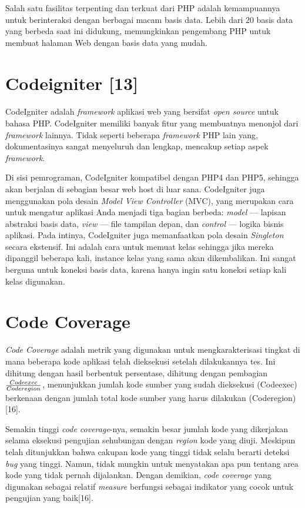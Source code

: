 Salah satu fasilitas terpenting dan terkuat dari PHP adalah kemampuannya untuk berinteraksi dengan berbagai macam basis data. Lebih dari 20 basis data yang berbeda saat ini didukung, memungkinkan pengembang PHP untuk membuat halaman Web dengan basis data yang mudah. 

\section{Codeigniter [13]}
\label{ci}
\paragraph{}
CodeIgniter adalah \textit{framework} aplikasi web yang bersifat \textit{open source} untuk bahasa PHP. CodeIgniter memiliki banyak fitur yang membuatnya menonjol dari \textit{framework} lainnya. Tidak seperti beberapa \textit{framework} PHP lain yang, dokumentasinya sangat menyeluruh dan lengkap, mencakup setiap aspek \textit{framework}. 

Di sisi pemrograman, CodeIgniter kompatibel dengan PHP4 dan PHP5, sehingga akan berjalan di sebagian besar web host di luar sana. CodeIgniter juga menggunakan pola desain \textit{Model View Controller} (MVC), yang merupakan cara untuk mengatur aplikasi Anda menjadi tiga bagian berbeda: \textit{model} — lapisan abstraksi basis data, \textit{view} — file tampilan depan, dan \textit{control} — logika bisnis aplikasi. Pada intinya, CodeIgniter juga memanfaatkan pola desain \textit{Singleton} secara ekstensif. Ini adalah cara untuk memuat kelas sehingga jika mereka dipanggil beberapa kali, instance kelas yang sama akan dikembalikan. Ini sangat berguna untuk koneksi basis data, karena hanya ingin satu koneksi setiap kali kelas digunakan.


\section{Code Coverage}
\label{codecoverage}
\textit{Code Coverage} adalah metrik yang digunakan untuk mengkarakterisasi tingkat di mana beberapa  kode aplikasi telah dieksekusi setelah dilakukannya tes. Ini dihitung dengan hasil berbentuk persentase, dihitung dengan pembagian $\frac{Code{\tiny exec}}{Code{\tiny region}}$, menunjukkan jumlah kode sumber yang sudah dieksekusi (Code{\tiny exec}) berkenaan dengan jumlah total kode sumber yang harus dilakukan (Code{\tiny region})[16].

Semakin tinggi \textit{code coverage}-nya, semakin besar jumlah kode yang dikerjakan selama eksekusi pengujian sehubungan dengan \textit{region} kode yang diuji. Meskipun telah ditunjukkan bahwa cakupan kode yang tinggi tidak selalu berarti deteksi \textit{bug} yang tinggi. Namun, tidak mungkin untuk menyatakan apa pun tentang area kode yang tidak pernah dijalankan. Dengan demikian, \textit{code coverage} yang digunakan sebagai relatif \textit{measure} berfungsi sebagai indikator yang cocok untuk pengujian yang baik[16].

